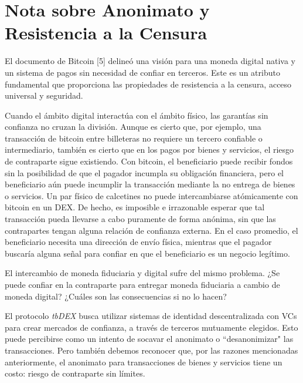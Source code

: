 \documentclass[11pt]{article}
\begin{document}
\vspace{1\baselineskip}
\section{Nota sobre Anonimato y Resistencia a la Censura}

\vspace{1\baselineskip}
El documento de Bitcoin [5] delineó una visión para una moneda digital nativa y un sistema de pagos sin necesidad de confiar en terceros. Este es un atributo fundamental que proporciona las propiedades de resistencia a la censura, acceso universal y seguridad.

\vspace{1\baselineskip}
Cuando el ámbito digital interactúa con el ámbito físico, las garantías sin confianza no cruzan la división. Aunque es cierto que, por ejemplo, una transacción de bitcoin entre billeteras no requiere un tercero confiable o intermediario, también es cierto que en los pagos por bienes y servicios, el riesgo de contraparte sigue existiendo. Con bitcoin, el beneficiario puede recibir fondos sin la posibilidad de que el pagador incumpla su obligación financiera, pero el beneficiario aún puede incumplir la transacción mediante la no entrega de bienes o servicios. Un par físico de calcetines no puede intercambiarse atómicamente con bitcoin en un DEX. De hecho, es imposible e irrazonable esperar que tal transacción pueda llevarse a cabo puramente de forma anónima, sin que las contrapartes tengan alguna relación de confianza externa. En el caso promedio, el beneficiario necesita una dirección de envío física, mientras que el pagador buscaría alguna señal para confiar en que el beneficiario es un negocio legítimo.

\vspace{1\baselineskip}
El intercambio de moneda fiduciaria y digital sufre del mismo problema. ¿Se puede confiar en la contraparte para entregar moneda fiduciaria a cambio de moneda digital? ¿Cuáles son las consecuencias si no lo hacen?

\vspace{1\baselineskip}
El protocolo \textit{tbDEX} busca utilizar sistemas de identidad descentralizada con VCs para crear mercados de confianza, a través de terceros mutuamente elegidos. Esto puede percibirse como un intento de socavar el anonimato o ``desanonimizar" las transacciones. Pero también debemos reconocer que, por las razones mencionadas anteriormente, el anonimato para transacciones de bienes y servicios tiene un costo: riesgo de contraparte sin límites.
\end{document}
